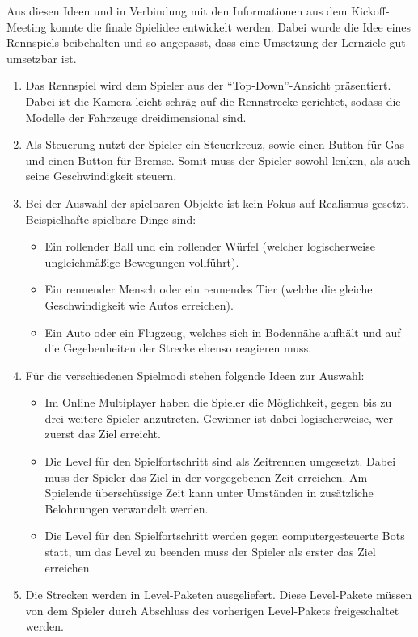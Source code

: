 	Aus diesen Ideen und in Verbindung mit den Informationen aus dem Kickoff-Meeting konnte die finale Spielidee entwickelt werden. Dabei wurde die Idee eines Rennspiels beibehalten und so angepasst, dass eine Umsetzung der Lernziele gut umsetzbar ist.
	\begin{enumerate}
		\item{Das Rennspiel wird dem Spieler aus der \enquote{Top-Down}-Ansicht präsentiert. Dabei ist die Kamera leicht schräg auf die Rennstrecke gerichtet, sodass die Modelle der Fahrzeuge dreidimensional sind.}
		\item{Als Steuerung nutzt der Spieler ein Steuerkreuz, sowie einen Button für Gas und einen Button für Bremse. Somit muss der Spieler sowohl lenken, als auch seine Geschwindigkeit steuern.}
		\item{Bei der Auswahl der spielbaren Objekte ist kein Fokus auf Realismus gesetzt. Beispielhafte spielbare Dinge sind:}
		\begin{itemize}
			\item{Ein rollender Ball und ein rollender Würfel (welcher logischerweise ungleichmäßige Bewegungen vollführt).}
			\item{Ein rennender Mensch oder ein rennendes Tier (welche die gleiche Geschwindigkeit wie Autos erreichen).}
			\item{Ein Auto oder ein Flugzeug, welches sich in Bodennähe aufhält und auf die Gegebenheiten der Strecke ebenso reagieren muss.}
		\end{itemize}
		\item{Für die verschiedenen Spielmodi stehen folgende Ideen zur Auswahl:}
		\begin{itemize}
			\item{Im Online Multiplayer haben die Spieler die Möglichkeit, gegen bis zu drei weitere Spieler anzutreten. Gewinner ist dabei logischerweise, wer zuerst das Ziel erreicht.}
			\item{Die Level für den Spielfortschritt sind als Zeitrennen umgesetzt. Dabei muss der Spieler das Ziel in der vorgegebenen Zeit erreichen. Am Spielende überschüssige Zeit kann unter Umständen in zusätzliche Belohnungen verwandelt werden.}
			\item{Die Level für den Spielfortschritt werden gegen computergesteuerte Bots statt, um das Level zu beenden muss der Spieler als erster das Ziel erreichen.}
		\end{itemize}
		\item{Die Strecken werden in Level-Paketen ausgeliefert. Diese Level-Pakete müssen von dem Spieler durch Abschluss des vorherigen Level-Pakets freigeschaltet werden.}

\end{enumerate}

